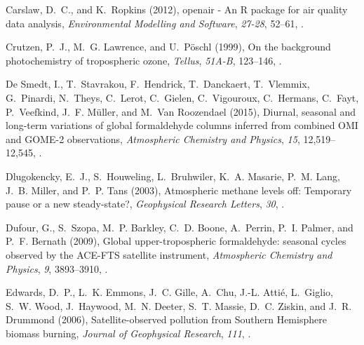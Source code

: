 \documentclass[draft,linenumbers]{AGUJournal}
\begin{document}
\begin{thebibliography}{51}
Carslaw, D.~C., and K.~Ropkins (2012), {openair - An R package for air quality
  data analysis}, \textit{Environmental Modelling and Software},
  \textit{27-28}, 52--61, .

Crutzen, P.~J., M.~G. Lawrence, and U.~P{\"{o}}schl (1999), {On the background
  photochemistry of tropospheric ozone}, \textit{Tellus}, \textit{51A-B},
  123--146, .

{De Smedt}, I., T.~Stavrakou, F.~Hendrick, T.~Danckaert, T.~Vlemmix,
  G.~Pinardi, N.~Theys, C.~Lerot, C.~Gielen, C.~Vigouroux, C.~Hermans, C.~Fayt,
  P.~Veefkind, J.~F. M{\"{u}}ller, and M.~{Van Roozendael} (2015), {Diurnal,
  seasonal and long-term variations of global formaldehyde columns inferred
  from combined OMI and GOME-2 observations}, \textit{Atmospheric Chemistry and
  Physics}, \textit{15}, 12,519--12,545, .

Dlugokencky, E.~J., S.~Houweling, L.~Bruhwiler, K.~A. Masarie, P.~M. Lang,
  J.~B. Miller, and P.~P. Tans (2003), {Atmospheric methane levels off:
  Temporary pause or a new steady-state?}, \textit{Geophysical Research
  Letters}, \textit{30}, .

Dufour, G., S.~Szopa, M.~P. Barkley, C.~D. Boone, A.~Perrin, P.~I. Palmer, and
  P.~F. Bernath (2009), {Global upper-tropospheric formaldehyde: seasonal
  cycles observed by the ACE-FTS satellite instrument}, \textit{Atmospheric
  Chemistry and Physics}, \textit{9}, 3893--3910,
  .

Edwards, D.~P., L.~K. Emmons, J.~C. Gille, A.~Chu, J.-L. Atti{\'{e}},
  L.~Giglio, S.~W. Wood, J.~Haywood, M.~N. Deeter, S.~T. Massie, D.~C. Ziskin,
  and J.~R. Drummond (2006), {Satellite-observed pollution from Southern
  Hemisphere biomass burning}, \textit{Journal of Geophysical Research},
  \textit{111}, .


\end{thebibliography}
\end{document}
